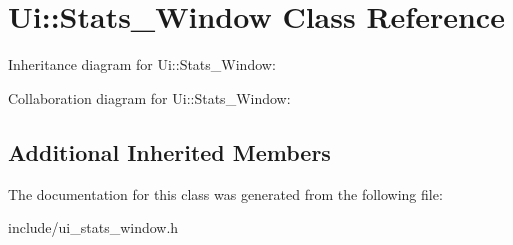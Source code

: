 \hypertarget{classUi_1_1Stats__Window}{}\section{Ui\+:\+:Stats\+\_\+\+Window Class Reference}
\label{classUi_1_1Stats__Window}


Inheritance diagram for Ui\+:\+:Stats\+\_\+\+Window\+:


Collaboration diagram for Ui\+:\+:Stats\+\_\+\+Window\+:
\subsection*{Additional Inherited Members}


The documentation for this class was generated from the following file\+:\begin{DoxyCompactItemize}
\item 
include/ui\+\_\+stats\+\_\+window.\+h\end{DoxyCompactItemize}
